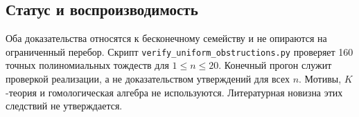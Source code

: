 \subsection{Статус и воспроизводимость}
Оба доказательства относятся к бесконечному семейству и не опираются
на ограниченный перебор. Скрипт \texttt{verify\_uniform\_obstructions.py}
проверяет 160 точных полиномиальных тождеств для $1\leq n\leq20$.
Конечный прогон служит проверкой реализации, а не доказательством
утверждений для всех $n$.
Мотивы, $K$-теория и гомологическая алгебра не используются.
Литературная новизна этих следствий не утверждается.
